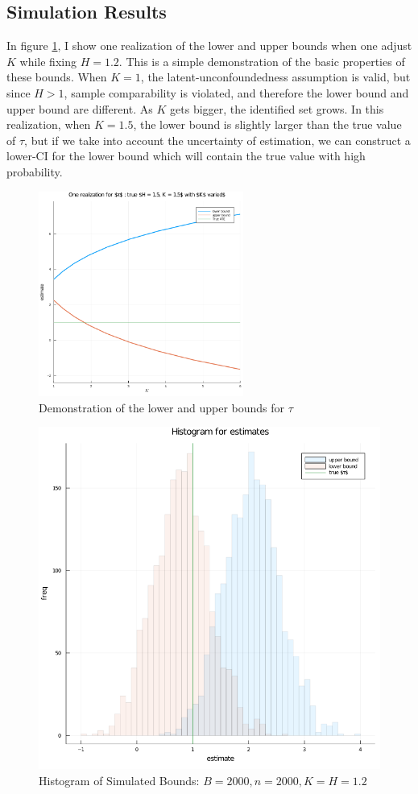 \documentclass[12pt]{article}
\begin{document}
    \subsection{Simulation Results}
    
    In figure \ref{fig:fig1}, I show one realization of the lower and upper bounds when one adjust $K$ while fixing $H = 1.2$. This is a simple demonstration of the basic properties of these bounds. When $K = 1$, the latent-unconfoundedness assumption is valid, but since $H > 1$, sample comparability is violated, and therefore the lower bound and upper bound are different. As $K$ gets bigger, the identified set grows. In this realization, when $K = 1.5$, the lower bound is slightly larger than the true value of $\tau$, but if we take into account the uncertainty of estimation, we can construct a lower-CI for the lower bound which will contain the true value with high probability.    
    
    \begin{figure}[!htbp]
        \centering
        \includegraphics[width=0.6\textwidth]{../code/fig1.png}
        \caption{Demonstration of the lower and upper bounds for $\tau$}
        \label{fig:fig1}
    \end{figure}
    
    \begin{figure}[!htbp]
        \centering
        \includegraphics[width = 0.6 \textwidth]{../code/fig2.png}
        \caption{Histogram of Simulated Bounds: $B = 2000, n = 2000, K = H = 1.2$}
        \label{fig:fig2}
    \end{figure}
    
\end{document}
